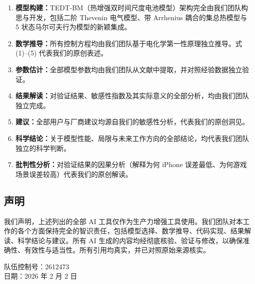 \documentclass[11pt,a4paper]{ctexart}
\begin{document}
\begin{enumerate}[leftmargin=2em,itemsep=0.3em]
\item \textbf{模型构建：}TEDT-BM（热增强双时间尺度电池模型）架构完全由我们团队构思与开发，包括二阶 Thevenin 电气模型、带 Arrhenius 耦合的集总热模型与 5 状态马尔可夫行为模型的新颖集成。
\item \textbf{数学推导：}所有控制方程均由我们团队基于电化学第一性原理独立推导。式 (1)--(5) 代表我们的原创表述。
\item \textbf{参数估计：}全部模型参数均由我们团队从文献中提取，并对照经验数据独立验证。
\item \textbf{结果解读：}对验证结果、敏感性指数及其实际意义的全部分析，均由我们团队独立完成。
\item \textbf{建议：}全部用户与厂商建议均源自我们的敏感性分析，代表我们的原创洞见。
\item \textbf{科学结论：}关于模型性能、局限与未来工作方向的全部结论，均代表我们团队独立的科学判断。
\item \textbf{批判性分析：}对验证结果的因果分析（解释为何 iPhone 误差最低、为何游戏场景误差较高）代表我们的原创解读。
\end{enumerate}

\subsection*{声明}

我们声明，上述列出的全部 AI 工具仅作为生产力增强工具使用。我们团队对本工作的各个方面保持完全的智识责任，包括模型选择、数学推导、代码实现、结果解读、科学结论与建议。所有 AI 生成的内容均经彻底核验、验证与修改，以确保准确性、有效性与适当性。所有引用均真实，并已对照原始来源核实。

\noindent 队伍控制号：2612473\\
日期：2026 年 2 月 2 日
\end{document}
